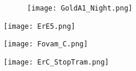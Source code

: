 \centering
\begin{figure}[h!]
	\centering
	\texttt{[image: GoldA1\_Night.png]}
	\caption[s]{}%
\end{figure}

\centering
\begin{sidewaysfigure}[h!]
	\centering
	\texttt{[image: ErE5.png]}
	\caption[]{}%
\end{sidewaysfigure}

\centering
\begin{sidewaysfigure}[h!]
	\centering
	\texttt{[image: Fovam\_C.png]}
	\caption[]{}%
\end{sidewaysfigure}

\centering
\begin{sidewaysfigure}[h!]
	\centering
	\texttt{[image: ErC\_StopTram.png]}
	\caption[]{}%
\end{sidewaysfigure}

